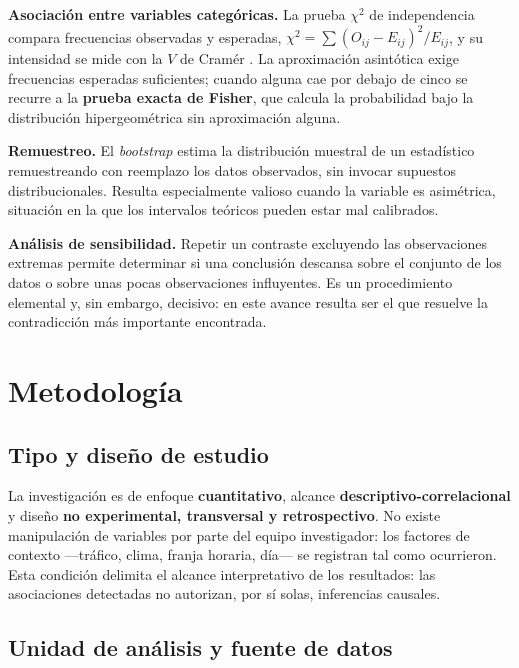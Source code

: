 \documentclass[
]{book}
\begin{document}
\textbf{Asociación entre variables categóricas.} La prueba \(\chi^2\) de independencia compara
frecuencias observadas y esperadas, \(\chi^2 = \sum (O_{ij}-E_{ij})^2/E_{ij}\), y su intensidad
se mide con la \(V\) de Cramér \citep{cramer1946}. La aproximación asintótica exige frecuencias
esperadas suficientes; cuando alguna cae por debajo de cinco se recurre a la \textbf{prueba exacta
de Fisher}, que calcula la probabilidad bajo la distribución hipergeométrica sin aproximación
alguna.

\textbf{Remuestreo.} El \emph{bootstrap} \citep{efron1979} estima la distribución muestral de un estadístico
remuestreando con reemplazo los datos observados, sin invocar supuestos distribucionales.
Resulta especialmente valioso cuando la variable es asimétrica, situación en la que los
intervalos teóricos pueden estar mal calibrados.

\textbf{Análisis de sensibilidad.} Repetir un contraste excluyendo las observaciones extremas
permite determinar si una conclusión descansa sobre el conjunto de los datos o sobre unas
pocas observaciones influyentes. Es un procedimiento elemental y, sin embargo, decisivo: en
este avance resulta ser el que resuelve la contradicción más importante encontrada.

\chapter{Metodología}\label{metodologia}

\section{Tipo y diseño de estudio}\label{tipo-y-diseuxf1o-de-estudio}

La investigación es de enfoque \textbf{cuantitativo}, alcance \textbf{descriptivo-correlacional} y
diseño \textbf{no experimental, transversal y retrospectivo}. No existe manipulación de variables
por parte del equipo investigador: los factores de contexto ---tráfico, clima, franja horaria,
día--- se registran tal como ocurrieron. Esta condición delimita el alcance interpretativo de
los resultados: las asociaciones detectadas no autorizan, por sí solas, inferencias causales.

\section{Unidad de análisis y fuente de datos}\label{unidad-de-anuxe1lisis-y-fuente-de-datos}
\end{document}
